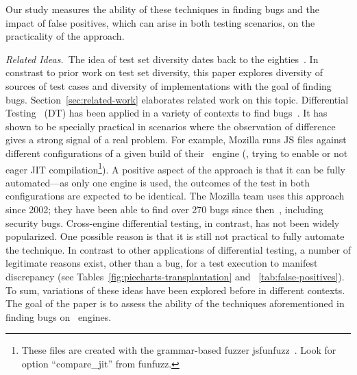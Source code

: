 \documentclass[sigconf,review, anonymous]{acmart}
\begin{document}
Our study measures the ability of these techniques in finding bugs and
the impact of false positives, which can arise in both testing
scenarios, on the practicality of the approach.


\emph{Related Ideas.}~The idea of test set diversity dates back to the
eighties~\cite{white-cohen-tse1980, ostrand-balcer-1988}. In constrast
to prior work on test set diversity, this paper explores diversity of
sources of test cases and diversity of implementations with the goal
of finding bugs. Section~\ref{sec:related-work} elaborates related
work on this topic. Differential Testing~\cite{Brumley-etal-ss07} (DT)
has been applied in a variety of contexts to find
bugs~\cite{Yang-etal-pldi11,Chen-etal-fse2015,Argyros-etla-ccs16,Chen-etal-pldi16,petsios-etal-sp2017,SivakornAPKJ17,Zhang:2017:ATD:3097368.3097448}.
It has shown to be specially practical in scenarios where the
observation of difference gives a strong signal of a real problem. For
example, Mozilla runs JS files against different configurations of
a given build of their \smonkey\ engine (\eg{}, trying to enable or
not eager JIT compilation\footnote{These files are created with
  the grammar-based fuzzer jsfunfuzz~\cite{jsfunfuzz}. Look for option
  ``compare\_jit'' from funfuzz.}). A positive aspect of the approach is that
it can be fully automated---as only one engine is used, the outcomes
of the test in both configurations are expected to be identical. The
Mozilla team uses this approach since 2002; they have been able to
find over 270 bugs since then~\cite{jsfunfuzz-at-mozilla}, including
security bugs. Cross-engine differential testing, in contrast, has not
been widely popularized. One possible reason is that it is still not
practical to fully automate the technique. In contrast to other
applications of differential testing, a number of legitimate reasons
exist, other than a bug, for a test execution to manifest discrepancy
(see Tables~\ref{fig:piecharts-transplantation} and
~\ref{tab:false-positives}). To sum, variations of these ideas have
been explored before in different contexts.  The goal of the paper is
to assess the ability of the techniques aforementioned in finding
bugs on \javascript\ engines.

\end{document}
